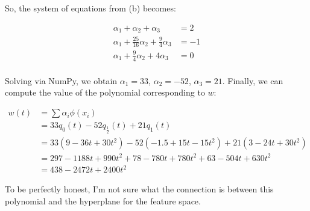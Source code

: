 \documentclass[fleqn]{homework}
\begin{document}
\begin{problem}{4}
\begin{enumerate}[(a)]
      So, the system of equations from (b) becomes:

      \begin{align*}
        \alpha_1 + \alpha_2 + \alpha_3 &= 2 \\
        \alpha_1 + \frac{25}{16}\alpha_2 + \frac{9}{4} \alpha_3&= -1 \\
        \alpha_1 +\frac{9}{4}\alpha_2 + 4\alpha_3 &= 0 \\
      \end{align*}

      Solving via NumPy, we obtain $\alpha_1 = 33$, $\alpha_2 = -52$,
      $\alpha_3 = 21$.  Finally, we can compute the value of the polynomial
      corresponding to $w$:

      \begin{align*}
        w(t) &= \sum \alpha_i \phi(x_i) \\
        &= 33 q_0(t) - 52 q_{\frac{1}{2}}(t) + 21 q_1(t) \\
        &= 33 (9 - 36t + 30t^2) - 52 (-1.5 + 15 t - 15t^2) + 21 (3 - 24t + 30t^2) \\
        &= 297 - 1188t + 990t^2 + 78 - 780t + 780t^2 + 63 - 504t + 630t^2 \\
        &= 438 - 2472t + 2400t^2
      \end{align*}

      To be perfectly honest, I'm not sure what the connection is between this
      polynomial and the hyperplane for the feature space.
    \end{enumerate}
  \end{problem}
\end{document}
